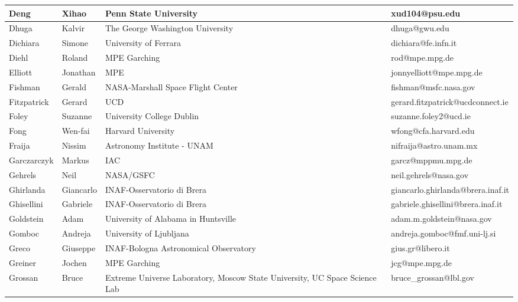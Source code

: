 \begin{center}
\begin{longtable}{|p{1.28cm} |p{1.28cm} |p{2.9cm} |p{3cm} |}
\tiny Deng &\tiny Xihao & \tiny Penn State University & \tiny xud104@psu.edu \\ \hline
\tiny Dhuga &\tiny Kalvir & \tiny The George Washington University & \tiny dhuga@gwu.edu \\ \hline
\tiny Dichiara &\tiny Simone & \tiny University of Ferrara & \tiny dichiara@fe.infn.it \\ \hline
\tiny Diehl &\tiny Roland & \tiny MPE Garching & \tiny rod@mpe.mpg.de \\ \hline
\tiny Elliott &\tiny Jonathan & \tiny MPE & \tiny jonnyelliott@mpe.mpg.de \\ \hline
\tiny Fishman &\tiny Gerald & \tiny NASA-Marshall Space Flight Center & \tiny fishman@msfc.nasa.gov \\ \hline
\tiny Fitzpatrick &\tiny Gerard & \tiny UCD & \tiny gerard.fitzpatrick@ucdconnect.ie \\ \hline
\tiny Foley &\tiny Suzanne & \tiny University College Dublin & \tiny suzanne.foley2@ucd.ie \\ \hline
\tiny Fong &\tiny Wen-fai & \tiny Harvard University & \tiny wfong@cfa.harvard.edu \\ \hline
\tiny Fraija &\tiny Nissim & \tiny Astronomy Institute - UNAM & \tiny nifraija@astro.unam.mx \\ \hline
\tiny Garczarczyk &\tiny Markus & \tiny IAC & \tiny garcz@mppmu.mpg.de \\ \hline
\tiny Gehrels &\tiny Neil & \tiny NASA/GSFC & \tiny neil.gehrels@nasa.gov \\ \hline
\tiny Ghirlanda &\tiny Giancarlo & \tiny INAF-Osservatorio di Brera & \tiny giancarlo.ghirlanda@brera.inaf.it \\ \hline
\tiny Ghisellini &\tiny Gabriele & \tiny INAF-Osservatorio di Brera & \tiny gabriele.ghisellini@brera.inaf.it \\ \hline
\tiny Goldstein &\tiny Adam & \tiny University of Alabama in Huntsville & \tiny adam.m.goldstein@nasa.gov \\ \hline
\tiny Gomboc &\tiny Andreja & \tiny University of Ljubljana & \tiny andreja.gomboc@fmf.uni-lj.si \\ \hline
\tiny Greco &\tiny Giuseppe & \tiny INAF-Bologna Astronomical Observatory & \tiny gius.gr@libero.it \\ \hline
\tiny Greiner &\tiny Jochen & \tiny MPE Garching & \tiny jcg@mpe.mpg.de \\ \hline
\tiny Grossan &\tiny Bruce & \tiny Extreme Universe Laboratory, Moscow State University, UC Space Science Lab & \tiny bruce\_grossan@lbl.gov \\ \hline

\end{longtable}
\end{center}
